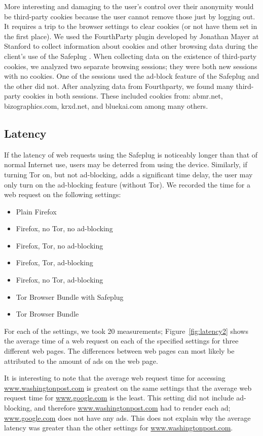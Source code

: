 More interesting and damaging to the user's control over their anonymity would be third-party cookies because the user cannot remove those just by logging out.  It requires a trip to the browser settings to clear cookies (or not have them set in the first place).  We used the FourthParty plugin developed by Jonathan Mayer at Stanford to collect information about cookies and other browsing data during the client's use of the Safeplug \cite{fourthparty}.  When collecting data on the existence of third-party cookies, we analyzed two separate browsing sessions; they were both new sessions with no cookies.  One of the sessions used the ad-block feature of the Safeplug and the other did not.  After analyzing data from Fourthparty, we found many third-party cookies in both sessions.  These included cookies from: abmr.net, bizographics.com, krxd.net, and bluekai.com among many others.

\subsection{Latency}
If the latency of web requests using the Safeplug is noticeably longer than that of normal Internet use, users may be deterred from using the device.  Similarly, if turning Tor on, but not ad-blocking, adds a significant time delay, the user may only turn on the ad-blocking feature (without Tor).  We recorded the time for a web request on the following settings:

\begin{itemize}
\item Plain Firefox
\item Firefox, no Tor, no ad-blocking
\item Firefox, Tor, no ad-blocking
\item Firefox, Tor, ad-blocking
\item Firefox, no Tor, ad-blocking
\item Tor Browser Bundle with Safeplug
\item Tor Browser Bundle
\end{itemize}

For each of the settings, we took 20 measurements; Figure~\ref{fig:latency2} shows the average time of a web request on each of the specified settings for three different web pages.  The differences between web pages can most likely be attributed to the amount of ads on the web page.  

It is interesting to note that the average web request time for accessing \url{www.washingtonpost.com} is greatest on the same settings that the average web request time for \url{www.google.com} is the least. This setting did not include ad-blocking, and therefore \url{www.washingtonpost.com} had to render each ad; \url{www.google.com} does not have any ads.  This does not explain why the average latency was greater than the other settings for \url{www.washingtonpost.com}. 

